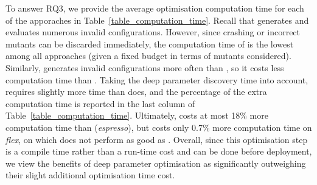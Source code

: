 To answer RQ3, we provide the average optimisation computation time for each of the apporaches in Table~\ref{table_computation_time}. Recall that \dr{} generates and evaluates numerous invalid configurations. However, since crashing or incorrect mutants can be discarded immediately, the computation time of \dr{} is the lowest among all approaches (given a fixed budget in terms of mutants considered). Similarly, \dn{} generates invalid configurations more often than \sn{}, so it costs less computation time than \sn{}. Taking the deep parameter discovery time into account, \dn{} requires slightly more time than \sn{} does, and the percentage of the extra computation time is reported in the last column of Table~\ref{table_computation_time}. Ultimately, \dn{} costs at most 18\% more computation time than \sn{} (\emph{espresso}), but costs only 0.7\% more computation time on \emph{flex}, on which \dn{} does not perform as good as \sn{}. Overall, since this optimisation step is a compile time rather than a run-time cost and can be done before deployment, we view the benefits of deep parameter optimisation as significantly outweighing their slight additional optimisation time cost.


